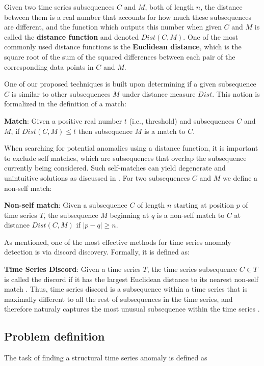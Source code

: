 \documentclass{sig-alternate}
\begin{document}
Given two time series subsequences $C$ and $M$, both of length $n$, the distance between them is a real number that accounts for how much these subsequences are different, and the function which outputs this number when given $C$ and $M$ is called the \textbf{distance function} and denoted $Dist(C,M)$. One of the most commonly used distance functions is the \textbf{Euclidean distance}, which is the square root of the sum of the squared differences between each pair of the corresponding data points in $C$ and $M$.

One of our proposed techniques is built upon determining if a given subsequence $C$ is similar to other subsequences $M$ under distance measure $Dist$. This notion is formalized in the definition of a match:

\textbf{Match}: Given a positive real number $t$ (i.e., threshold) and subsequences $C$ and $M$, if $Dist(C,M)\leq t$ then subsequence $M$ is a match to $C$.

When searching for potential anomalies using a distance function, it is important to exclude self matches, which are subsequences that overlap the subsequence currently being considered. Such self-matches can yield degenerate and unintuitive solutions as discussed in \cite{hot_sax}. For two subsequences $C$ and $M$ we define a non-self match:

\textbf{Non-self match}: Given a subsequence $C$ of  length $n$ starting at position $p$ of time series $T$, the subsequence $M$ beginning at $q$ is a non-self match to $C$ at distance $Dist(C,M)$ if $|p-q| \geq n$.

As mentioned, one of the most effective methods for time series anomaly detection is via discord discovery. Formally, it is defined as:

\textbf{Time Series Discord}: Given a time series $T$, the time series subsequence $C \in T$ is called the discord if it has the largest Euclidean distance to its nearest non-self match \cite{hot_sax}. Thus, time series discord is a subsequence within a time series that is maximally different to all the rest of subsequences in the time series, and therefore naturaly captures the most unusual subsequence within the time series \cite{hot_sax}.

\subsection{Problem definition}
The task of finding a structural time series anomaly is defined as 
\end{document}
